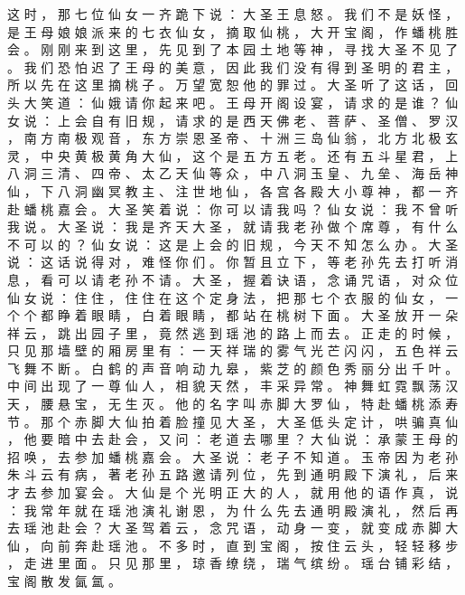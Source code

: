 {这 时 ， 那 七 位 仙 女 一 齐 跪 下 说 ： 大 圣 王 息 怒 。
我 们 不 是 妖 怪 ， 是 王 母 娘 娘 派 来 的 七 衣 仙 女 ， 摘 取 仙 桃 ， 大 开 宝 阁 ， 作 蟠 桃 胜 会 。
刚 刚 来 到 这 里 ， 先 见 到 了 本 园 土 地 等 神 ， 寻 找 大 圣 不 见 了 。
我 们 恐 怕 迟 了 王 母 的 美 意 ， 因 此 我 们 没 有 得 到 圣 明 的 君 主 ， 所 以 先 在 这 里 摘 桃 子 。
万 望 宽 恕 他 的 罪 过 。
大 圣 听 了 这 话 ， 回 头 大 笑 道 ： 仙 娥 请 你 起 来 吧 。
王 母 开 阁 设 宴 ， 请 求 的 是 谁 ？ 仙 女 说 ： 上 会 自 有 旧 规 ， 请 求 的 是 西 天 佛 老 、 菩 萨 、 圣 僧 、 罗 汉 ， 南 方 南 极 观 音 ， 东 方 崇 恩 圣 帝 、 十 洲 三 岛 仙 翁 ， 北 方 北 极 玄 灵 ， 中 央 黄 极 黄 角 大 仙 ， 这 个 是 五 方 五 老 。
还 有 五 斗 星 君 ， 上 八 洞 三 清 、 四 帝 、 太 乙 天 仙 等 众 ， 中 八 洞 玉 皇 、 九 垒 、 海 岳 神 仙 ， 下 八 洞 幽 冥 教 主 、 注 世 地 仙 ， 各 宫 各 殿 大 小 尊 神 ， 都 一 齐 赴 蟠 桃 嘉 会 。
大 圣 笑 着 说 ： 你 可 以 请 我 吗 ？ 仙 女 说 ： 我 不 曾 听 我 说 。
大 圣 说 ： 我 是 齐 天 大 圣 ， 就 请 我 老 孙 做 个 席 尊 ， 有 什 么 不 可 以 的 ？ 仙 女 说 ： 这 是 上 会 的 旧 规 ， 今 天 不 知 怎 么 办 。
大 圣 说 ： 这 话 说 得 对 ， 难 怪 你 们 。
你 暂 且 立 下 ， 等 老 孙 先 去 打 听 消 息 ， 看 可 以 请 老 孙 不 请 。
大 圣 ， 握 着 诀 语 ， 念 诵 咒 语 ， 对 众 位 仙 女 说 ： 住 住 ， 住 住 在 这 个 定 身 法 ， 把 那 七 个 衣 服 的 仙 女 ， 一 个 个 都 睁 着 眼 睛 ， 白 着 眼 睛 ， 都 站 在 桃 树 下 面 。
大 圣 放 开 一 朵 祥 云 ， 跳 出 园 子 里 ， 竟 然 逃 到 瑶 池 的 路 上 而 去 。
正 走 的 时 候 ， 只 见 那 墙 壁 的 厢 房 里 有 ： 一 天 祥 瑞 的 雾 气 光 芒 闪 闪 ， 五 色 祥 云 飞 舞 不 断 。
白 鹤 的 声 音 响 动 九 皋 ， 紫 芝 的 颜 色 秀 丽 分 出 千 叶 。
中 间 出 现 了 一 尊 仙 人 ， 相 貌 天 然 ， 丰 采 异 常 。
神 舞 虹 霓 飘 荡 汉 天 ， 腰 悬 宝 ， 无 生 灭 。
他 的 名 字 叫 赤 脚 大 罗 仙 ， 特 赴 蟠 桃 添 寿 节 。
那 个 赤 脚 大 仙 拍 着 脸 撞 见 大 圣 ， 大 圣 低 头 定 计 ， 哄 骗 真 仙 ， 他 要 暗 中 去 赴 会 ， 又 问 ： 老 道 去 哪 里 ？ 大 仙 说 ： 承 蒙 王 母 的 招 唤 ， 去 参 加 蟠 桃 嘉 会 。
大 圣 说 ： 老 子 不 知 道 。
玉 帝 因 为 老 孙 朱 斗 云 有 病 ， 著 老 孙 五 路 邀 请 列 位 ， 先 到 通 明 殿 下 演 礼 ， 后 来 才 去 参 加 宴 会 。
大 仙 是 个 光 明 正 大 的 人 ， 就 用 他 的 语 作 真 ， 说 ： 我 常 年 就 在 瑶 池 演 礼 谢 恩 ， 为 什 么 先 去 通 明 殿 演 礼 ， 然 后 再 去 瑶 池 赴 会 ？
大 圣 驾 着 云 ， 念 咒 语 ， 动 身 一 变 ， 就 变 成 赤 脚 大 仙 ， 向 前 奔 赴 瑶 池 。
不 多 时 ， 直 到 宝 阁 ， 按 住 云 头 ， 轻 轻 移 步 ， 走 进 里 面 。
只 见 那 里 ， 琼 香 缭 绕 ， 瑞 气 缤 纷 。
瑶 台 铺 彩 结 ， 宝 阁 散 发 氤 氲 。
}
